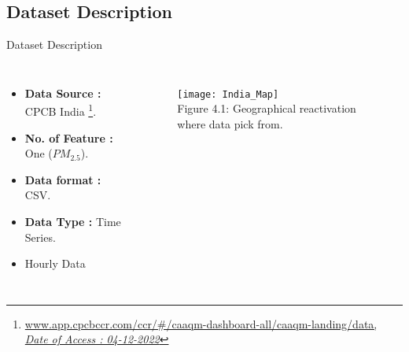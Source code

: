 \documentclass[12pt, aspectratio=169]{beamer}
\begin{document}
\subsection{Dataset Description}
\begin{frame}{Dataset Description}
	\begin{columns}
		\begin{itemize}
			\item \textbf{Data Source : }CPCB India \footnote{\href{https://app.cpcbccr.com/ccr/\#/caaqm-dashboard-all/caaqm-landing/data}{\footnotesize {www.app.cpcbccr.com/ccr/\#/caaqm-dashboard-all/caaqm-landing/data,\\ \textit{ Date of Access : 04-12-2022}}}}.
			\item \textbf{No. of Feature : }One ($PM_{2.5}$).
			\item \textbf{Data format : }CSV.
			\item \textbf{Data Type : }Time Series.
			\item Hourly Data
		\end{itemize}
		\begin{figure}
			\centering
			\texttt{[image: India\_Map]}\\ 
			\scriptsize{Figure 4.1: Geographical reactivation where data pick from.}
		\end{figure}
	\end{columns}
	
\end{frame}
\end{document}
